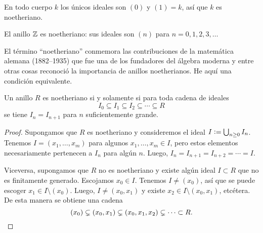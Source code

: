 \begin{ejemplo}
  En todo cuerpo $k$ los únicos ideales son $(0)$ y $(1) = k$, así que $k$
  es noetheriano.

  El anillo $\mathbb{Z}$ es noetheriano: sus ideales son $(n)$ para
  $n = 0,1,2,3,\ldots$
\end{ejemplo}

El término ``noetheriano'' conmemora las contribuciones de la matemática alemana
 (1882--1935) que fue una de los fundadores del
álgebra moderna y entre otras cosas reconoció la importancia de anillos
noetherianos. He aquí una condición equivalente.

\begin{observacion}
  Un anillo $R$ es noetheriano si y solamente si para toda cadena de ideales
  $$I_0 \subseteq I_1 \subseteq I_2 \subseteq \cdots \subseteq R$$
  se tiene $I_n = I_{n+1}$ para $n$ suficientemente grande.

  \begin{proof}
    Supongamos que $R$ es noetheriano y consideremos el ideal
    $I \mathrel{\mathop:}= \bigcup_{n\ge 0} I_n$. Tenemos $I = (x_1,\ldots,x_m)$ para algunos
    $x_1,\ldots,x_m \in I$, pero estos elementos necesariamente pertenecen a
    $I_n$ para algún $n$. Luego, $I_n = I_{n+1} = I_{n+2} = \cdots = I$.

    Viceversa, supongamos que $R$ no es noetheriano y existe algún ideal
    $I \subset R$ que no es finitamente generado. Escojamos $x_0 \in I$. Tenemos
    $I \ne (x_0)$, así que se puede escoger $x_1 \in I\setminus (x_0)$. Luego,
    $I \ne (x_0,x_1)$ y existe $x_2 \in I \setminus (x_0,x_1)$, etcétera. De
    esta manera se obtiene una cadena
    \[ (x_0) \subsetneq (x_0,x_1) \subsetneq (x_0,x_1,x_2) \subsetneq \cdots
             \subset R. \qedhere \]
  \end{proof}
\end{observacion}

%

